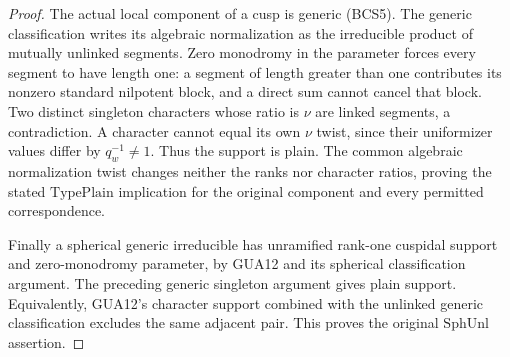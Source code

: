 \documentclass[11pt,a4paper]{article}
\numberwithin{equation}{section}
\theoremstyle{remark}\newtheorem{remark}[theorem]{Remark}
\begin{document}
\begin{proof}
The actual local component of a cusp is generic (BCS5).
The generic classification writes its algebraic normalization
as the irreducible product of mutually unlinked segments.
Zero monodromy in the parameter forces every segment to have
length one: a segment of length greater than one contributes
its nonzero standard nilpotent block, and a direct sum cannot
cancel that block.  Two distinct singleton characters whose
ratio is $\nu$ are linked segments, a contradiction.  A
character cannot equal its own $\nu$ twist, since their
uniformizer values differ by $q_w^{-1}\ne1$.
Thus the support is plain.  The common algebraic normalization
twist changes neither the ranks nor character ratios, proving
the stated $\mathrm{TypePlain}$ implication for the original
component and every permitted correspondence.

Finally a spherical generic irreducible has unramified
rank-one cuspidal support and zero-monodromy parameter, by
GUA12 and its spherical classification argument.  The preceding
generic singleton argument gives plain support.  Equivalently,
GUA12's character support combined with the unlinked generic
classification excludes the same adjacent pair.  This proves
the original $\mathrm{SphUnl}$ assertion.
\end{proof}

\end{document}
